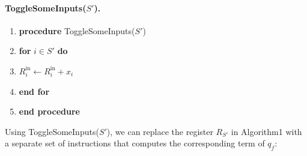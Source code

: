 \documentclass[10pt,a4paper]{article}
\begin{document}
\paragraph{ToggleSomeInputs($S'$).}
\begin{enumerate}[label=\arabic*:]
\item \textbf{procedure} ToggleSomeInputs($S'$)
\item \textbf{for} $i\in S'$ \textbf{do}
\item $R_i^{\mathrm{in}}\leftarrow R_i^{\mathrm{in}}+x_i$
\item \textbf{end for}
\item \textbf{end procedure}
\end{enumerate}
Using ToggleSomeInputs($S'$), we can replace the register $R_{S'}$ in Algorithm1 with a separate set of instructions that computes the corresponding term of $q_f$:
\end{document}
